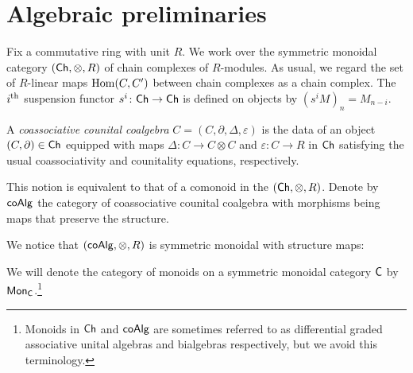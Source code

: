 
\section{Algebraic preliminaries}

Fix a commutative ring with unit $R$. 
We work over the symmetric monoidal category $(\mathsf{Ch}, \otimes, R)$ of chain complexes of $R$-modules.
As usual, we regard the set of $R$-linear maps $\mathrm{Hom}(C, C^\prime)$ between chain complexes as a chain complex.
The $i^\mathrm{th}$ suspension functor $s^i \colon \mathsf{Ch} \to \mathsf{Ch}$ is defined on objects by $(s^{i}M)_n= M_{n-i}$.

A \textit{coassociative counital coalgebra} $C=(C, \partial, \Delta, \varepsilon)$ is the data of an object $(C, \partial) \in \mathsf{Ch}$ equipped with maps $\Delta: C \to C \otimes C$ and $\varepsilon: C\to R$ in $\mathsf{Ch}$ satisfying the usual coassociativity and counitality equations, respectively. 

This notion is equivalent to that of a comonoid in the $(\mathsf{Ch}, \otimes, R)$. Denote by $\mathsf{coAlg}$ the category of coassociative counital coalgebra with morphisms being maps that preserve the structure. 

We notice that $(\mathsf{coAlg}, \otimes, R)$ is symmetric monoidal with structure maps:
\begin{center}
 \par
{}
\end{center}

We will denote the category of monoids on a symmetric monoidal category $\mathsf{C}$ by $\mathsf{Mon}_{\mathsf{C}}$.\footnote{Monoids in $\mathsf{Ch}$ and $\mathsf{coAlg}$ are sometimes referred to as differential graded associative unital algebras and bialgebras respectively, but we avoid this terminology.}




